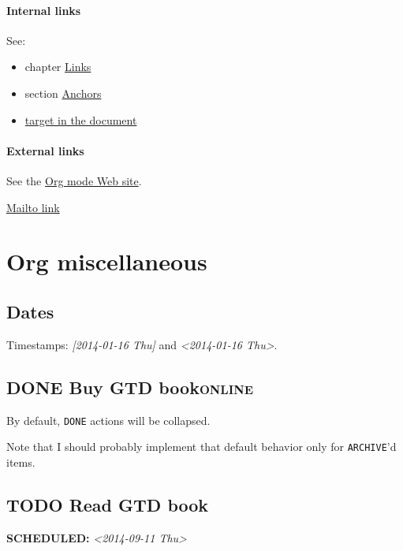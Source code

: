 \documentclass[11pt]{article}
\begin{document}
\paragraph*{Internal links}
\label{sec:org56ad81f}

See:
\begin{itemize}
\item chapter \hyperref[sec:org3dabed7]{Links}
\item section \hyperref[sec:orgef6bed0]{Anchors}
\item \hyperref[orgc288a92]{target in the document}
\end{itemize}

\paragraph*{External links}
\label{sec:orgc09ee30}

See the \href{http://orgmode.org/}{Org mode Web site}.

\href{mailto:concat.fni.at-sign.pirilampo.org}{Mailto link}

\section*{Org miscellaneous}
\label{sec:org892a90a}

\subsection*{Dates}
\label{sec:org33b6293}

Timestamps: \textit{[2014-01-16 Thu] } and \textit{<2014-01-16 Thu>}.

\subsection*{{\bfseries\sffamily DONE} Buy GTD book\hfill{}\textsc{online}}
\label{sec:org3b32805}
By default, \texttt{DONE} actions will be collapsed.

Note that I should probably implement that default behavior only for \texttt{ARCHIVE}'d
items.

\subsection*{{\bfseries\sffamily TODO} Read GTD book}
\label{sec:org5494720}
\noindent\textbf{SCHEDULED:} \textit{<2014-09-11 Thu>}\\[0pt]
\end{document}

